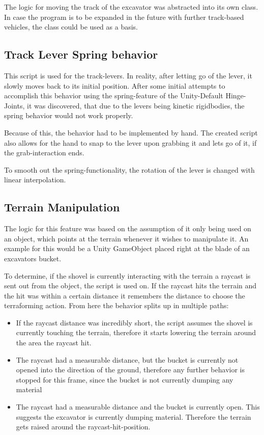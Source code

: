 \documentclass[journal]{vgtc}                     %
\begin{document}
The logic for moving the track of the excavator was abstracted into its own class. In case the program is to be expanded in the future with further track-based vehicles, the class could be used as a basis.


\subsection{Track Lever Spring behavior} \label{trackLeverSpringBehavior}
This script is used for the track-levers. In reality, after letting go of the lever, it slowly moves back to its initial position. After some initial attempts to accomplish this behavior using the spring-feature of the Unity-Default Hinge-Joints, it was discovered, that due to the levers being kinetic rigidbodies, the spring behavior would not work properly. 

Because of this, the behavior had to be implemented by hand. The created script also allows for the hand to snap to the lever upon grabbing it and lets go of it, if the grab-interaction ends.

To smooth out the spring-functionality, the rotation of the lever is changed with linear interpolation.


\subsection{Terrain Manipulation}

The logic for this feature was based on the assumption of it only being used on an object, which points at the terrain whenever it wishes to manipulate it. 
An example for this would be a Unity GameObject placed right at the blade of an excavators bucket.

To determine, if the shovel is currently interacting with the terrain a raycast is sent out from the object, the script is used on. If the raycast hits the terrain and the hit was within a certain distance it remembers the distance to choose the terraforming action. From here the behavior splits up in multiple paths:

\begin{itemize}
  \item If the raycast distance was incredibly short, the script assumes the shovel is currently touching the terrain, therefore it starts lowering the terrain around the area the raycast hit.
  \item The raycast had a measurable distance, but the bucket is currently not opened into the direction of the ground, therefore any further behavior is stopped for this frame, since the bucket is not currently dumping any material
  \item The raycast had a measurable distance and the bucket is currently open. This suggests the excavator is currently dumping material. Therefore the terrain gets raised around the raycast-hit-position.
\end{itemize}
\end{document}
